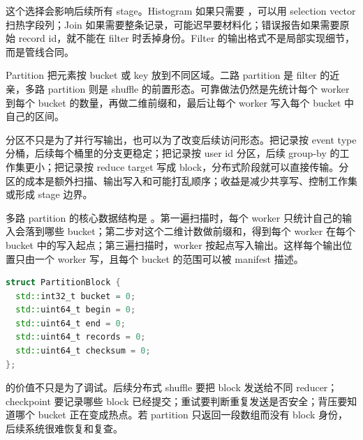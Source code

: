 这个选择会影响后续所有 stage。Histogram 如果只需要 ，可以用 selection vector 扫热字段列；Join 如果需要整条记录，可能迟早要材料化；错误报告如果需要原始 record id，就不能在 filter 时丢掉身份。Filter 的输出格式不是局部实现细节，而是管线合同。

Partition 把元素按 bucket 或 key 放到不同区域。二路 partition 是 filter 的近亲，多路 partition 则是 shuffle 的前置形态。可靠做法仍然是先统计每个 worker 到每个 bucket 的数量，再做二维前缀和，最后让每个 worker 写入每个 bucket 中自己的区间。

分区不只是为了并行写输出，也可以为了改变后续访问形态。把记录按 event type 分桶，后续每个桶里的分支更稳定；把记录按 user id 分区，后续 group-by 的工作集更小；把记录按 reduce target 写成 block，分布式阶段就可以直接传输。分区的成本是额外扫描、输出写入和可能打乱顺序；收益是减少共享写、控制工作集或形成 stage 边界。

多路 partition 的核心数据结构是 。第一遍扫描时，每个 worker 只统计自己的输入会落到哪些 bucket；第二步对这个二维计数做前缀和，得到每个 worker 在每个 bucket 中的写入起点；第三遍扫描时，worker 按起点写入输出。这样每个输出位置只由一个 worker 写，且每个 bucket 的范围可以被 manifest 描述。

\begin{lstlisting}[language=C++,caption={PartitionBlock 描述输出块身份}]
struct PartitionBlock {
  std::int32_t bucket = 0;
  std::uint64_t begin = 0;
  std::uint64_t end = 0;
  std::uint64_t records = 0;
  std::uint64_t checksum = 0;
};
\end{lstlisting}

 的价值不只是为了调试。后续分布式 shuffle 要把 block 发送给不同 reducer；checkpoint 要记录哪些 block 已经提交；重试要判断重复发送是否安全；背压要知道哪个 bucket 正在变成热点。若 partition 只返回一段数组而没有 block 身份，后续系统很难恢复和复查。

